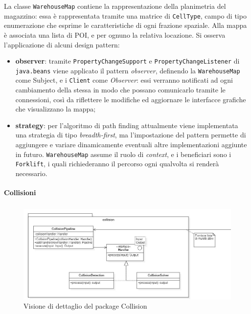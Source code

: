 La classe \texttt{WarehouseMap} contiene la rappresentazione della planimetria del magazzino: essa è rappresentata tramite una matrice di \texttt{CellType}, campo di tipo enumerazione che esprime le caratteristiche di ogni frazione spaziale. Alla mappa è associata una lista di POI, e per ognuno la relativa locazione.
Si osserva l'applicazione di alcuni design pattern:
\begin{itemize}
	\item \textbf{observer}: tramite \texttt{PropertyChangeSupport} e \texttt{PropertyChangeListener} di \texttt{java.beans} viene applicato il pattern \textit{observer}, definendo la \texttt{WarehouseMap} come Subject, e i \texttt{Client} come \textit{Observer}: essi verranno notificati ad ogni cambiamento della stessa in modo che possano comunicarlo tramite le connessioni, così da riflettere le modifiche ed aggiornare le interfacce grafiche che visualizzano la mappa;
	\item \textbf{strategy}: per l’algoritmo di path finding attualmente viene implementata una strategia di tipo \textit{breadth-first}, ma l’impostazione del pattern permette di aggiungere e variare dinamicamente eventuali altre implementazioni aggiunte in futuro. \texttt{WarehouseMap} assume il ruolo di \textit{context}, e i beneficiari sono i \texttt{Forklift}, i quali richiederanno il percorso ogni qualvolta si renderà necessario.
\end{itemize}





\paragraph{Collisioni}
\label{collision-details}
\subparagraph*{ }

\begin{figure}[H]
	\centering
	\includegraphics[scale=0.50]{res/diagrams/server/server_pack_collision.jpg}
	\caption{Visione di dettaglio del package Collision}
\end{figure}


